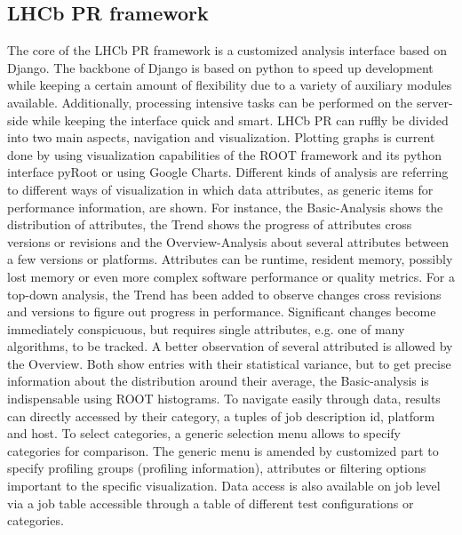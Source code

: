 \documentclass[a4paper]{jpconf}
\begin{document}
\subsection{LHCb PR framework}
\label{sec:lhcbpr_framework}

The core of the LHCb PR framework is a customized analysis interface based on Django. The backbone of Django is based on python to speed up development while keeping a certain amount of flexibility due to a variety of auxiliary modules available. Additionally, processing intensive tasks can be performed on the server-side while keeping the interface quick and smart.
\newline
LHCb PR can ruffly be divided into two main aspects, navigation and visualization. Plotting graphs is current done by using visualization capabilities of the ROOT framework and its python interface pyRoot or using Google Charts. Different kinds of analysis are referring to different ways of visualization in which data attributes, as generic items for performance information, are shown. For instance, the Basic-Analysis shows the distribution of attributes, the Trend shows the progress of attributes cross versions or revisions and the Overview-Analysis about several attributes between a few versions or platforms. Attributes can be runtime, resident memory, possibly lost memory or even more complex software performance or quality metrics.
\newline
For a top-down analysis, the Trend has been added to observe changes cross revisions and versions to figure out progress in performance. Significant changes become immediately conspicuous, but requires single attributes, e.g. one of many algorithms, to be tracked. A better observation of several attributed is allowed by the Overview. Both show entries with their statistical variance, but to get precise information about the distribution around their average, the Basic-analysis is indispensable using ROOT histograms.
\newline
To navigate easily through data, results can directly accessed by their category, a tuples of job description id, platform and host. To select categories, a generic selection menu allows to specify categories for comparison.  The generic menu is amended by customized part to specify profiling groups (profiling information), attributes or filtering options important to the specific visualization. Data access is also available on job level via a job table accessible through a table of different test configurations or categories.
\end{document}
